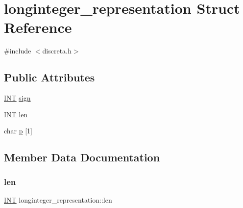 \hypertarget{structlonginteger__representation}{}\section{longinteger\+\_\+representation Struct Reference}
\label{structlonginteger__representation}


{\ttfamily \#include $<$discreta.\+h$>$}

\subsection*{Public Attributes}
\begin{DoxyCompactItemize}
\item 
\mbox{\hyperlink{galois_8h_a09fddde158a3a20bd2dcadb609de11dc}{I\+NT}} \mbox{\hyperlink{structlonginteger__representation_a7433f35e6857a586dddd665f225ca5fc}{sign}}
\item 
\mbox{\hyperlink{galois_8h_a09fddde158a3a20bd2dcadb609de11dc}{I\+NT}} \mbox{\hyperlink{structlonginteger__representation_a9c88a8da822ee92edba27bc88f4ca5d9}{len}}
\item 
char \mbox{\hyperlink{structlonginteger__representation_a3e0ff3f06008d1949c23a4af64ef3d45}{p}} \mbox{[}1\mbox{]}
\end{DoxyCompactItemize}


\subsection{Member Data Documentation}
\mbox{\label{structlonginteger__representation_a9c88a8da822ee92edba27bc88f4ca5d9}} 
\subsubsection{\texorpdfstring{len}{len}}
{\footnotesize\ttfamily \mbox{\hyperlink{galois_8h_a09fddde158a3a20bd2dcadb609de11dc}{I\+NT}} longinteger\+\_\+representation\+::len}

\mbox{\label{structlonginteger__representation_a3e0ff3f06008d1949c23a4af64ef3d45}} 
